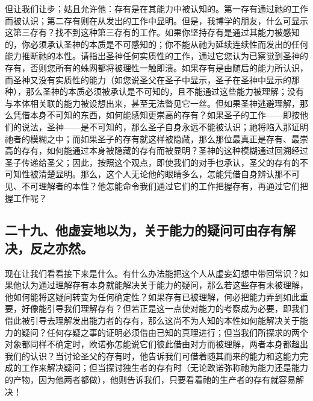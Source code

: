 但让我们让步；姑且允许他：存有是在其能力中被认知的。第一存有通过祂的工作而被认识；第二存有则在从发出的工作中显明。但是，我博学的朋友，什么可显示这第三存有？找不到这种第三存有的工作。如果你坚持存有是通过其能力被感知的，你必须承认圣神的本质是不可感知的；你不能从祂为延续连续性而发出的任何能力推断祂的本性。请指出圣神任何实质性的工作，通过它您认为已察觉到圣神的存有，否则您所有的蛛网都将被理性一触即溃。如果存有是由随后的能力所认识，而圣神又没有实质性的能力（如您说圣父在圣子中显示，圣子在圣神中显示的那种），那么圣神的本质必须被承认是不可知的，且不能通过这些能力被理解；没有与本体相关联的能力被设想出来，甚至无法瞥见它一丝。但如果圣神逃避理解，那么凭借本身不可知的东西，如何能感知更崇高的存有？如果圣子的工作——即按他们的说法，圣神——是不可知的，那么圣子自身永远不能被认识；祂将陷入那证明祂者的模糊之中；而如果圣子的存有就这样被隐藏，那么那位最真正是存有、最崇高的存有，如何能通过本身被隐藏的存有而被显明？圣神的这种模糊通过回溯经过圣子传递给圣父；因此，按照这个观点，即使我们的对手也承认，圣父的存有的不可知性被清楚显明。那么，这个人无论他的眼睛多么，怎能凭借自身辨认那不可见、不可理解者的本性？他怎能命令我们通过它们的工作把握存有，再通过它们把握工作呢？\par


\subsection{二十九、他虚妄地以为，关于能力的疑问可由存有解决，反之亦然。}

现在让我们看看接下来是什么。有什么办法能把这个人从虚妄幻想中带回常识？如果他认为通过理解存有本身就能解决关于能力的疑问，那么若这些存有未被理解，他如何能将这疑问转变为任何确定性？如果存有已被理解，何必把能力弄到如此重要，好像能引导我们理解存有？但若正是这一点使对能力的考察成为必要，即我们借此被引导去理解发出能力者的存有，那么这尚不为人知的本性如何能解决关于能力的疑问？任何存疑之事的证明必须借由已知的真理进行；但当我们所探求的两个对象都同样不确定时，欧诺弥怎能说它们彼此借由对方而被理解，两者本身都超出我们的认识？当讨论圣父的存有时，他告诉我们可借着随其而来的能力和这能力完成的工作来解决疑问；但当探讨独生者的存有时（无论欧诺弥称祂为能力还是能力的产物，因为他两者都做），他则告诉我们，只要看着祂的生产者的存有就容易解决！\par


